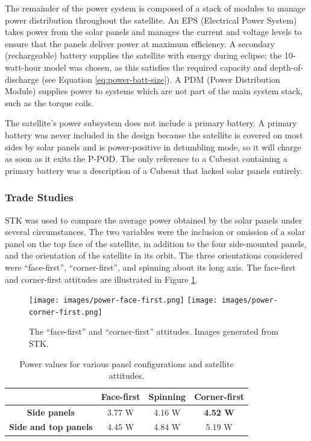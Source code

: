 \documentclass[12pt]{article}
\begin{document}
The remainder of the power system is composed of a stack of modules to manage power distribution throughout the satellite.  An EPS (Electrical Power System) takes power from the solar panels and manages the current and voltage levels to ensure that the panels deliver power at maximum efficiency.  A secondary (rechargeable) battery supplies the satellite with energy during eclipse; the 10-watt-hour model was chosen, as this satisfies the required capacity and depth-of-discharge (see Equation \ref{eq:power-batt-size}).  A PDM (Power Distribution Module) supplies power to systems which are not part of the main system stack, such as the torque coils.

The satellite's power subsystem does not include a primary battery.  A primary battery was never included in the design because the satellite is covered on most sides by solar panels and is power-positive in detumbling mode, so it will charge as soon as it exits the P-POD.  The only reference to a Cubesat containing a primary battery was a description of a Cubesat that lacked solar panels entirely.\cite{libertad-1}

\subsubsection{Trade Studies}
			
			STK was used to compare the average power obtained by the solar panels under several circumstances.  The two variables were the inclusion or omission of a solar panel on the top face of the satellite, in addition to the four side-mounted panels, and the orientation of the satellite in its orbit.  The three orientations considered were ``face-first'', ``corner-first'', and spinning about its long axis.  The face-first and corner-first attitudes are illustrated in Figure \ref{fig:power-orientations}.
			
			\begin{figure}[ht]%
\centering
\texttt{[image: images/power-face-first.png]}%
\hspace{0.5in}
\texttt{[image: images/power-corner-first.png]}
\caption{The ``face-first'' and ``corner-first'' attitudes.  Images generated from STK.}%
\label{fig:power-orientations}%
\end{figure}
			
			\begin{table}[ht]
\caption{Power values for various panel configurations and satellite attitudes.}
\label{tab:power-trade-study}
\begin{center}
    \begin{tabular}{|c|c|c|c|} \hline
    	 & \textbf{Face-first} & \textbf{Spinning} & \textbf{Corner-first} \\  \hline
\textbf{Side panels} & 3.77 W & 4.16 W & \textbf{4.52 W} \\\hline
\textbf{Side and top panels} & 4.45 W & 4.84 W & 5.19 W \\\hline
    \end{tabular}
\end{center}
\end{table}
\end{document}
